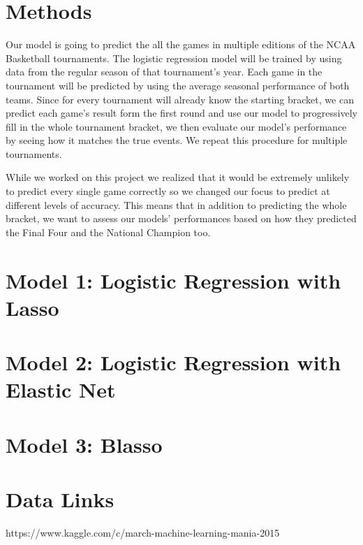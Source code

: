 \documentclass{article} %
\begin{document}


\section{Methods}
\label{gen_inst}

Our model is going to predict the all the games in multiple editions of the NCAA Basketball tournaments. The logistic regression model will be trained by using data from the regular season of that tournament's year. Each game in the tournament will be predicted by using the average seasonal performance of both teams. Since for every tournament will already know the starting bracket, we can predict each game's result form the first round and use our model to progressively fill in the whole tournament bracket, we then evaluate our model's performance by seeing how it matches the true events. We repeat this procedure for multiple tournaments.

While we worked on this project we realized that it would be extremely unlikely to predict every single game correctly so we changed our focus to predict at different levels of accuracy. This means that in addition to predicting the whole bracket, we want to assess our models' performances based on how they predicted the Final Four and the National Champion too.

\section{Model 1: Logistic Regression with Lasso}
\section{Model 2: Logistic Regression with Elastic Net}
\section{Model 3: Blasso}

\section{Data Links}
 https://www.kaggle.com/c/march-machine-learning-mania-2015
 
\end{document}

